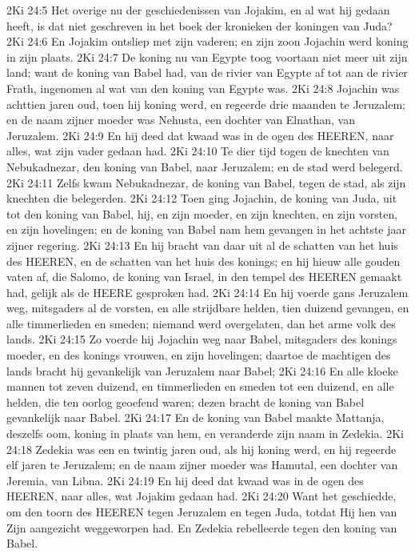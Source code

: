 2Ki 24:5  Het overige nu der geschiedenissen van Jojakim, en al wat hij gedaan heeft, is dat niet geschreven in het boek der kronieken der koningen van Juda?
2Ki 24:6  En Jojakim ontsliep met zijn vaderen; en zijn zoon Jojachin werd koning in zijn plaats.
2Ki 24:7  De koning nu van Egypte toog voortaan niet meer uit zijn land; want de koning van Babel had, van de rivier van Egypte af tot aan de rivier Frath, ingenomen al wat van den koning van Egypte was.
2Ki 24:8  Jojachin was achttien jaren oud, toen hij koning werd, en regeerde drie maanden te Jeruzalem; en de naam zijner moeder was Nehusta, een dochter van Elnathan, van Jeruzalem.
2Ki 24:9  En hij deed dat kwaad was in de ogen des HEEREN, naar alles, wat zijn vader gedaan had.
2Ki 24:10  Te dier tijd togen de knechten van Nebukadnezar, den koning van Babel, naar Jeruzalem; en de stad werd belegerd.
2Ki 24:11  Zelfs kwam Nebukadnezar, de koning van Babel, tegen de stad, als zijn knechten die belegerden.
2Ki 24:12  Toen ging Jojachin, de koning van Juda, uit tot den koning van Babel, hij, en zijn moeder, en zijn knechten, en zijn vorsten, en zijn hovelingen; en de koning van Babel nam hem gevangen in het achtste jaar zijner regering.
2Ki 24:13  En hij bracht van daar uit al de schatten van het huis des HEEREN, en de schatten van het huis des konings; en hij hieuw alle gouden vaten af, die Salomo, de koning van Israel, in den tempel des HEEREN gemaakt had, gelijk als de HEERE gesproken had.
2Ki 24:14  En hij voerde gans Jeruzalem weg, mitsgaders al de vorsten, en alle strijdbare helden, tien duizend gevangen, en alle timmerlieden en smeden; niemand werd overgelaten, dan het arme volk des lands.
2Ki 24:15  Zo voerde hij Jojachin weg naar Babel, mitsgaders des konings moeder, en des konings vrouwen, en zijn hovelingen; daartoe de machtigen des lands bracht hij gevankelijk van Jeruzalem naar Babel;
2Ki 24:16  En alle kloeke mannen tot zeven duizend, en timmerlieden en smeden tot een duizend, en alle helden, die ten oorlog geoefend waren; dezen bracht de koning van Babel gevankelijk naar Babel.
2Ki 24:17  En de koning van Babel maakte Mattanja, deszelfs oom, koning in plaats van hem, en veranderde zijn naam in Zedekia.
2Ki 24:18  Zedekia was een en twintig jaren oud, als hij koning werd, en hij regeerde elf jaren te Jeruzalem; en de naam zijner moeder was Hamutal, een dochter van Jeremia, van Libna.
2Ki 24:19  En hij deed dat kwaad was in de ogen des HEEREN, naar alles, wat Jojakim gedaan had.
2Ki 24:20  Want het geschiedde, om den toorn des HEEREN tegen Jeruzalem en tegen Juda, totdat Hij hen van Zijn aangezicht weggeworpen had. En Zedekia rebelleerde tegen den koning van Babel.

